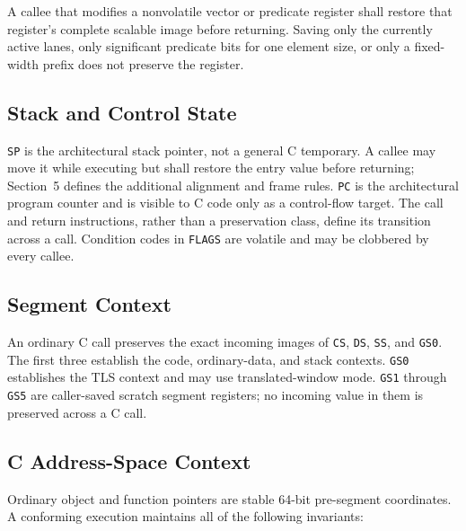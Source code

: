\documentclass[10pt,twoside]{article}
\begin{document}
A callee that modifies a nonvolatile vector or predicate register shall
restore that register's complete scalable image before returning. Saving only
the currently active lanes, only significant predicate bits for one element
size, or only a fixed-width prefix does not preserve the register.

\subsection{Stack and Control State}
\texttt{SP} is the architectural stack pointer, not a general C temporary. A
callee may move it while executing but shall restore the entry value before
returning; Section~5 defines the additional alignment and frame rules.
\texttt{PC} is the architectural program counter and is visible to C code
only as a control-flow target. The call and return instructions, rather than a
preservation class, define its transition across a call. Condition codes in
\texttt{FLAGS} are volatile and may be clobbered by every callee.

\subsection{Segment Context}
An ordinary C call preserves the exact incoming images of \texttt{CS},
\texttt{DS}, \texttt{SS}, and \texttt{GS0}. The first three establish the
code, ordinary-data, and stack contexts. \texttt{GS0} establishes the TLS
context and may use translated-window mode. \texttt{GS1} through \texttt{GS5}
are caller-saved scratch segment registers; no incoming value in them is
preserved across a C call.

\subsection{C Address-Space Context}
Ordinary object and function pointers are stable 64-bit pre-segment
coordinates. A conforming execution maintains all of the following invariants:
\end{document}
